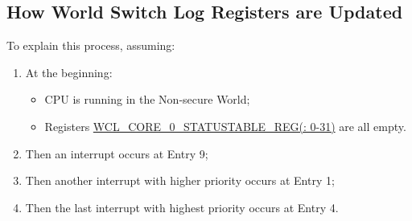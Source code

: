 \documentclass[main\_\_EN.tex]{subfiles}
\begin{document}
\subsection{How World Switch Log Registers are Updated}\label{sec:wctrl-update-statetable}

To explain this process, assuming:
\begin{enumerate}
    \item At the beginning:
    \begin{itemize}
        \item CPU is running in the Non-secure World;
        \item Registers \hyperref[regdesc:WCLCORE0STATUSTABLE0REG]{WCL\_CORE\_0\_STATUSTABLE\_REG(: 0-31)} are all empty.
    \end{itemize}
    \item Then an interrupt occurs at Entry 9;
    \item Then another interrupt with higher priority occurs at Entry 1;
    \item Then the last interrupt with highest priority occurs at Entry 4.
\end{enumerate}  
\end{document}
